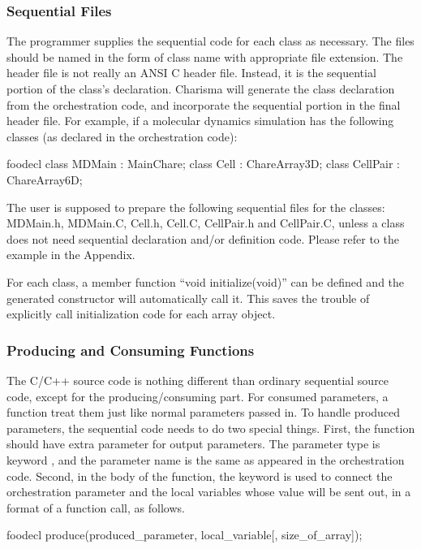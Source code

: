 \subsubsection{Sequential Files}
The programmer supplies the sequential code for each class as necessary. The
files should be named in the form of class name with appropriate file extension.
The header file is not really an ANSI C header file. Instead, it is the
sequential portion of the class's declaration. Charisma will generate the class 
declaration from the orchestration code, and incorporate the sequential portion
in the final header file. For example, if a molecular dynamics simulation has
the following classes (as declared in the orchestration code):

\begin{SaveVerbatim}{foodecl}
    class MDMain : MainChare;
    class Cell : ChareArray3D;
    class CellPair : ChareArray6D;
\end{SaveVerbatim}

The user is supposed to prepare the following sequential files for the classes:
MDMain.h, MDMain.C, Cell.h, Cell.C, CellPair.h and CellPair.C, unless a class
does not need sequential declaration and/or definition code. Please refer to the
example in the Appendix. 

For each class, a member function ``void initialize(void)'' can be defined and
the generated constructor will automatically call it. This saves the trouble of 
explicitly call initialization code for each array object. 

\subsubsection{Producing and Consuming Functions}
The C/C++ source code is nothing different than ordinary sequential source code,
except for the producing/consuming part. For consumed parameters, a function
treat them just like normal parameters passed in. To handle produced parameters, 
the sequential code needs to do two special things. First, the function should 
have extra parameter for output parameters. The parameter type is keyword ,
and the parameter name is the same as appeared in the orchestration code. Second,
in the body of the function, the keyword  is used to connect the 
orchestration parameter and the local variables whose value will be sent out, in 
a format of a function call, as follows.

\begin{SaveVerbatim}{foodecl}
    produce(produced_parameter, local_variable[, size_of_array]);
\end{SaveVerbatim}

